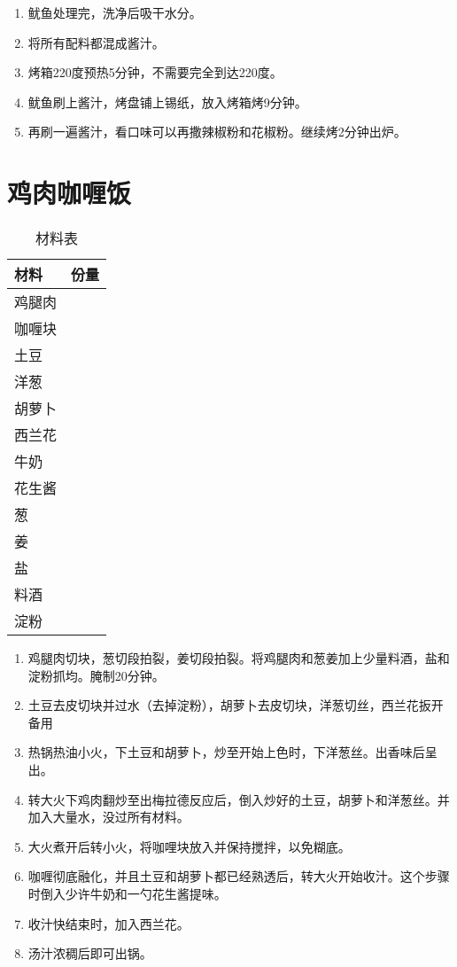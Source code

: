 \begin{enumerate}
    \item 鱿鱼处理完，洗净后吸干水分。
    \item 将所有配料都混成酱汁。
    \item 烤箱220度预热5分钟，不需要完全到达220度。
    \item 鱿鱼刷上酱汁，烤盘铺上锡纸，放入烤箱烤9分钟。
    \item 再刷一遍酱汁，看口味可以再撒辣椒粉和花椒粉。继续烤2分钟出炉。
\end{enumerate}



\section{鸡肉咖喱饭}

\begin{table}[H]
    \centering
    \begin{tabular}{|l||c|}\hline
     \textbf{材料}    &  \textbf{份量}\\ \hline\hline
    鸡腿肉    &   \\ \hline
    咖喱块    &  \\ \hline
    土豆    &  \\ \hline
    洋葱    &  \\ \hline
    胡萝卜    &  \\ \hline
    西兰花    &  \\ \hline
    牛奶    &  \\ \hline
    花生酱    &  \\ \hline
    葱 &  \\ \hline
    姜 &  \\ \hline
    盐 &  \\ \hline
    料酒 &  \\ \hline
    淀粉 &  \\ \hline
    \end{tabular}
    \caption{材料表}
\end{table}

\begin{enumerate}
    \item 鸡腿肉切块，葱切段拍裂，姜切段拍裂。将鸡腿肉和葱姜加上少量料酒，盐和淀粉抓均。腌制20分钟。
    \item 土豆去皮切块并过水（去掉淀粉），胡萝卜去皮切块，洋葱切丝，西兰花扳开备用
    \item 热锅热油小火，下土豆和胡萝卜，炒至开始上色时，下洋葱丝。出香味后呈出。
    \item 转大火下鸡肉翻炒至出梅拉德反应后，倒入炒好的土豆，胡萝卜和洋葱丝。并加入大量水，没过所有材料。
    \item 大火煮开后转小火，将咖哩块放入并保持搅拌，以免糊底。
    \item 咖喱彻底融化，并且土豆和胡萝卜都已经熟透后，转大火开始收汁。这个步骤时倒入少许牛奶和一勺花生酱提味。
    \item 收汁快结束时，加入西兰花。
    \item 汤汁浓稠后即可出锅。
\end{enumerate}


